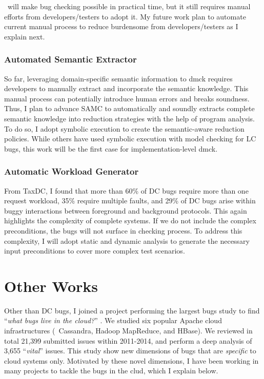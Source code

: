 \documentclass[11pt]{article}
\begin{document}
\fullcheck\ will make bug checking possible in practical time, but it still
requires manual efforts from developers/testers to adopt it. My future work plan
to automate current manual process to reduce burdensome from developers/testers
as I explain next.

\subsubsection*{Automated Semantic Extractor}

So far, leveraging domain-specific semantic information to dmck requires
developers to manually extract and incorporate the semantic knowledge. This
manual process can potentially introduce human errors and breaks soundness.
Thus, I plan to advance SAMC to automatically and soundly extracts complete
semantic knowledge into reduction strategies with the help of program analysis.
To do so, I adopt symbolic execution to create the semantic-aware reduction
policies. While others have used symbolic execution with model checking for LC
bugs, this work will be the first case for implementation-level dmck. 

\subsubsection*{Automatic Workload Generator}

From TaxDC, I found that more than 60\% of DC bugs require more than one
request workload, 35\% require multiple faults, and 29\% of DC bugs arise
within buggy interactions between foreground and background protocols. This
again highlights the complexity of complete systems. If we do not include the
complex preconditions, the bugs will not surface in checking process. To
address this complexity, I will adopt static and dynamic analysis to generate
the necessary input preconditions to cover more complex test scenarios.

\section{Other Works}

Other than DC bugs, I joined a project performing the largest bugs study to find
``\textit{what bugs live in the cloud?}'' \cite{Gunawi+14-Cbs}. We studied six
popular Apache cloud infrastructures (\eg\ Cassandra, Hadoop MapReduce, and
HBase). We reviewed in total 21,399 submitted issues within 2011-2014, and
perform a deep analysis of 3,655 ``\textit{vital}'' issues. This study show new
dimensions of bugs that are \textit{specific} to cloud systems only. Motivated
by these novel dimensions, I have been working in many projects to tackle the
bugs in the clud, which I explain below.
\end{document}
